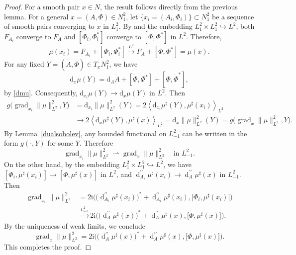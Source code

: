 \documentclass[a4paper]{amsart}
\theoremstyle{definition}
\theoremstyle{remark}
\numberwithin{equation}{section}
\begin{document}
\begin{proof}
For a smooth pair $x \in N$, the result follows directly from the previous lemma. For a general $x = (A, \Phi) \in N_1^2$, let $\{x_i = (A_i, \Phi_i)\} \subset N_1^2$ be a sequence of smooth pairs converging to $x$ in $L_1^2$. By \cite[Lemma~1.1]{uhlenbeck1982connections} and the embedding $L_1^2 \times L_1^2 \hookrightarrow L^2$, both $F_{A_i}$ converge to $F_A$ and $[\Phi_i, \Phi_i^*]$ converge to $[\Phi, \Phi^*]$ in $L^2$. Therefore,
\[
\mu(x_i) = F_{A_i} + [\Phi_i, \Phi_i^*] \xrightarrow{L^2} F_A + [\Phi, \Phi^*] = \mu(x).
\]
For any fixed $Y = (\dot{A}, \dot{\Phi}) \in T_x N_1^2$, we have 
\[
\mathrm{d}_x \mu(Y) = \mathrm{d}_A \dot{A} + [\dot{\Phi}, \Phi^*] + [\Phi, \dot{\Phi}^*],
\]
by \eqref{dmu}. Consequently, $\mathrm{d}_{x_i} \mu(Y) \to \mathrm{d}_x \mu(Y)$ in $L^2$. Then
\begin{align*}
g\big(\operatorname{grad}_{x_i}\|\mu\|^2_{L^2}, Y\big) 
&= \mathrm{d}_{x_i} \|\mu\|^2_{L^2}(Y) = 2 \left\langle \mathrm{d}_{x_i} \mu^\sharp(Y), \mu^\sharp(x_i) \right\rangle_{L^2} \\
&\to 2\left\langle \mathrm{d}_x \mu^\sharp(Y), \mu^\sharp(x) \right\rangle_{L^2} = \mathrm{d}_x \|\mu\|^2_{L^2}(Y) = g\big(\operatorname{grad}_x\|\mu\|^2_{L^2}, Y\big).
\end{align*}
By Lemma~\ref{dualsobolev}, any bounded functional on $L_{-1}^2$ can be written in the form $g(\cdot, Y)$ for some $Y$. Therefore
\[
\operatorname{grad}_{x_i}\|\mu\|^2_{L^2} \rightharpoonup \operatorname{grad}_x\|\mu\|^2_{L^2} \quad \text{in } L_{-1}^2.
\]
On the other hand, by the embedding $L_1^2 \times L_1^2 \hookrightarrow L^2$, we have $[\Phi_i, \mu^\sharp(x_i)] \to [\Phi, \mu^\sharp(x)]$ in $L^2$, and $\operatorname{d}_{A_i}^{\prime\prime} \mu^\sharp(x_i) \to \operatorname{d}_A^{\prime\prime} \mu^\sharp(x)$ in $L_{-1}^2$. Then
\begin{align*}
\operatorname{grad}_{x_i}\|\mu\|^2_{L^2}&=2\mathrm{i} \Big( \big( \operatorname{d}_{A_i}^{\prime\prime} \mu^\sharp(x_i) \big)^* + \operatorname{d}_{A_i}^{\prime\prime} \mu^\sharp(x_i), \big[\Phi_i, \mu^\sharp(x_i)\big] \Big) \\
&\xrightarrow{L_{-1}^2} 
2\mathrm{i} \Big( \big( \operatorname{d}_A^{\prime\prime} \mu^\sharp(x) \big)^* + \operatorname{d}_A^{\prime\prime} \mu^\sharp(x), \big[\Phi, \mu^\sharp(x)\big] \Big).
\end{align*}
By the uniqueness of weak limits, we conclude
\[
\operatorname{grad}_x \|\mu\|^2_{L^2} = 2\mathrm{i} \Big( \big( \operatorname{d}_A^{\prime\prime} \mu^\sharp(x) \big)^* + \operatorname{d}_A^{\prime\prime} \mu^\sharp(x), \big[\Phi, \mu^\sharp(x)\big] \Big).
\]
This completes the proof.
\end{proof}
\end{document}
